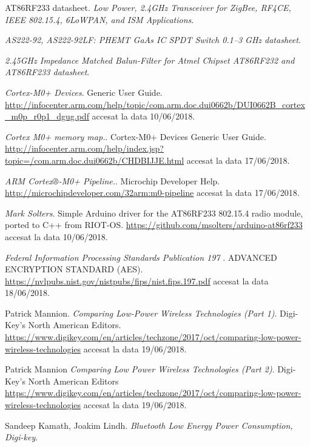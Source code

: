\documentclass[12pt,a4paper]{report}
\begin{document}
\begin{thebibliography}{9}
AT86RF233 datasheet. 
\textit{Low Power, 2.4GHz Transceiver for ZigBee, RF4CE, IEEE 802.15.4, 6LoWPAN, and ISM Applications}.

\textit{AS222-92, AS222-92LF: PHEMT GaAs IC SPDT Switch 0.1–3 GHz datasheet}.

\textit{2.45GHz Impedance Matched Balun-Filter for Atmel Chipset AT86RF232 and AT86RF233 datasheet}.

\textit{Cortex-M0+ Devices}.
Generic User Guide.
\url{http://infocenter.arm.com/help/topic/com.arm.doc.dui0662b/DUI0662B\_cortex\_m0p\_r0p1\_dgug.pdf} accesat la data 10/06/2018.

\textit{Cortex M0+ memory map.}.
Cortex-M0+ Devices Generic User Guide. 
\url{http://infocenter.arm.com/help/index.jsp?topic=/com.arm.doc.dui0662b/CHDBIJJE.html} accesat la data 17/06/2018.

\textit{ARM Cortex®-M0+ Pipeline.}.
Microchip Developer Help.
\url{http://microchipdeveloper.com/32arm:m0-pipeline} accesat la data 17/06/2018.

\textit{Mark Solters}.
Simple Arduino driver for the AT86RF233 802.15.4 radio module, ported to C++ from RIOT-OS.
\url{https://github.com/msolters/arduino-at86rf233} accesat la data 10/06/2018.

\textit{Federal Information Processing Standards Publication 197 }.
ADVANCED ENCRYPTION STANDARD (AES).
\url{https://nvlpubs.nist.gov/nistpubs/fips/nist.fips.197.pdf} accesat la data 18/06/2018.

Patrick Mannion.
\textit{Comparing Low-Power Wireless Technologies (Part 1)}.
Digi-Key's North American Editors.
\url{https://www.digikey.com/en/articles/techzone/2017/oct/comparing-low-power-wireless-technologies} accesat la data 19/06/2018.

Patrick Mannion
\textit{Comparing Low Power Wireless Technologies (Part 2)}.
Digi-Key's North American Editors
\url{https://www.digikey.com/en/articles/techzone/2017/oct/comparing-low-power-wireless-technologies} accesat la data 19/06/2018.

Sandeep Kamath, Joakim Lindh.
\textit{Bluetooth Low Energy Power Consumption, Digi-key}.
\end{thebibliography}
\end{document}

